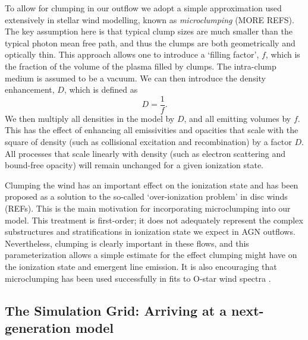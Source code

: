 \documentclass[useAMS,usenatbib]{mn2e_x}
\begin{document}
To allow for clumping in our outflow we adopt a simple approximation
used extensively in stellar wind modelling, known as 
{\em microclumping} \citep{hamann1998}(MORE REFS). The key assumption here is that 
typical clump sizes are much smaller than the typical photon mean free path, 
and thus the clumps are 
both geometrically and optically thin. This approach 
allows one to introduce a `filling factor', $f$, which is the 
fraction of the volume of the plasma filled by clumps. The intra-clump
medium is assumed to be a vacuum. We can then introduce the 
density enhancement, $D$, which is defined as 
\begin{equation}
D = \frac{1}{f}.
\end{equation}
We then multiply all densities in the model by $D$, and all emitting volumes
by $f$. This has the effect of enhancing all emissivities and opacities
that scale with the square of density (such as collisional excitation and recombination) 
by a factor $D$. All processes that scale linearly with density 
(such as electron scattering and bound-free opacity)
will remain unchanged for a given ionization state. 

Clumping the wind has an important effect on the ionization state and has
been proposed as a solution to the so-called `over-ionization problem' in 
disc winds (REFs). This is the main motivation for incorporating microclumping
into our model. This treatment is first-order; it does not adequately
represent the complex substructures and stratifications in ionization
state we expect in AGN outflows. Nevertheless, clumping is clearly
important in these flows, and this parameterization allows a simple estimate
for the effect clumping might have on the ionization state and emergent 
line emission. It is also encouraging that microclumping has been used 
successfully in fits to O-star wind spectra \citep{hillier1991eswingsmodel}.

\subsection{The Simulation Grid: Arriving at a next-generation model}
\end{document}
